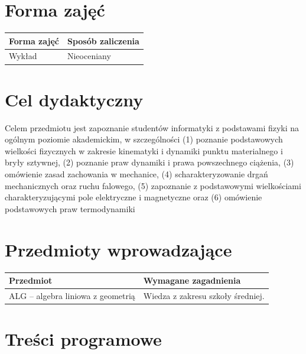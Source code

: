 \documentclass[12pt, a4paper]{article}
\begin{document}
\section{Forma zajęć}

\begin{tabular}{ll}
  \hline
  \textbf{Forma zajęć} & \textbf{Sposób zaliczenia} \\
  \hline
  Wykład & Nieoceniany \\
  \hline
\end{tabular}

\section{Cel dydaktyczny}

Celem przedmiotu jest zapoznanie studentów informatyki z podstawami fizyki na ogólnym poziomie akademickim, w szczególności (1) poznanie podstawowych wielkości fizycznych w zakresie kinematyki i dynamiki punktu materialnego i bryły sztywnej, (2) poznanie praw dynamiki i prawa powszechnego ciążenia, (3) omówienie zasad zachowania w mechanice, (4) scharakteryzowanie drgań mechanicznych oraz ruchu falowego, (5) zapoznanie z podstawowymi wielkościami charakteryzującymi pole elektryczne i magnetyczne oraz (6) omówienie podstawowych praw termodynamiki

\section{Przedmioty wprowadzające}

\begin{tabularx}{\textwidth}{lX}
  \hline
  \textbf{Przedmiot} & \textbf{Wymagane zagadnienia} \\
  \hline
  ALG – algebra liniowa z geometrią & Wiedza z zakresu szkoły średniej. \\
  \hline
\end{tabularx}

\section{Treści programowe}
\end{document}
